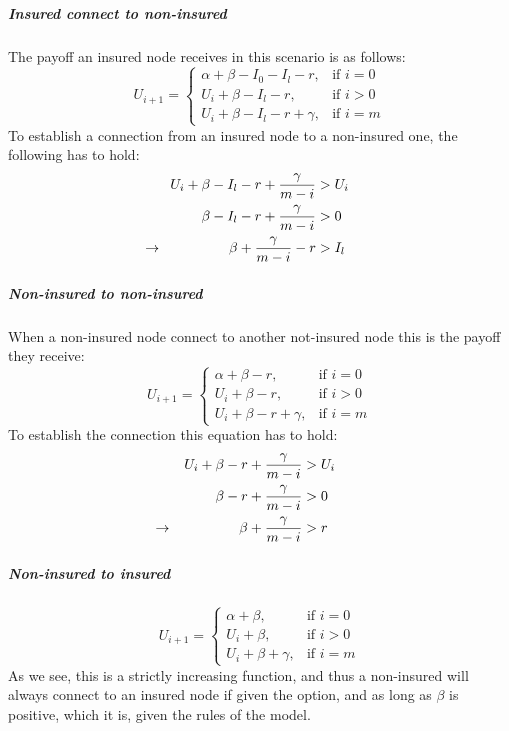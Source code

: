 \subparagraph{Insured connect to non-insured}
The payoff an insured node receives in this scenario is as follows:
\begin{equation}
    U_{i+1}= 
\begin{cases}
    \alpha + \beta - I_{0} - I_{l} -r,& \text{if } i = 0\\
    U_{i}+\beta -I_{l}-r,& \text{if }  i>0\\
    U_{i}+\beta -I_{l}-r+\gamma,& \text{if } i=m
\end{cases}
\label{eq:itonoti}
\end{equation}
To establish a connection from an insured node to a non-insured one, the following has to hold:
\begin{eqnarray}
U_{i}+\beta-I_{l}-r+\frac{\gamma}{m-i}&>U_{i} \nonumber \\ 
\beta-I_{l}-r+\frac{\gamma}{m-i}&>0 \nonumber \\ 
\llap{$\rightarrow$\hspace{50pt}} \beta+\frac{\gamma}{m-i}-r&>I_{l} 
\end{eqnarray}
\subparagraph{Non-insured to non-insured}
When a non-insured node connect to another not-insured node this is the payoff they receive:
\begin{equation}
    U_{i+1}= 
\begin{cases}
    \alpha + \beta -r,& \text{if } i = 0\\
    U_{i}+\beta -r,& \text{if }  i>0\\
    U_{i}+\beta -r +\gamma,& \text{if } i=m
\end{cases}
\label{eq:noitonoti}
\end{equation}
To establish the connection this equation has to hold:
\begin{eqnarray}
U_{i}+\beta-r+\frac{\gamma}{m-i}&>U_{i} \nonumber \\ 
\beta-r+\frac{\gamma}{m-i}&>0 \nonumber \\ 
\llap{$\rightarrow$\hspace{50pt}} \beta+\frac{\gamma}{m-i}&>r
\end{eqnarray}
\subparagraph{Non-insured to insured}
\begin{equation}
    U_{i+1}= 
\begin{cases}
    \alpha + \beta,& \text{if } i = 0\\
    U_{i}+\beta,& \text{if }  i>0\\
    U_{i}+\beta +\gamma,& \text{if } i=m
\end{cases}
\label{eq:noitoti}
\end{equation}
As we see, this is a strictly increasing function, and thus a non-insured will always connect to an insured node if given the option, and as long as $\beta$ is positive, which it is, given the rules of the model.

